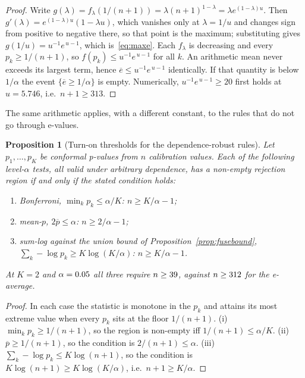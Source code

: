 \documentclass[preprint,12pt,authoryear]{elsarticle}
\newtheorem{proposition}[theorem]{Proposition}
\theoremstyle{definition}
\begin{document}
\begin{proof}
Write $g(\lambda) = f_\lambda(1/(n{+}1)) = \lambda (n{+}1)^{1-\lambda} = \lambda
e^{(1-\lambda)u}$. Then $g'(\lambda) = e^{(1-\lambda)u}(1 - \lambda u)$, which
vanishes only at $\lambda = 1/u$ and changes sign from positive to negative there,
so that point is the maximum; substituting gives $g(1/u) = u^{-1}e^{\,u-1}$, which
is~\eqref{eq:maxe}. Each $f_\lambda$ is decreasing and every $p_k \ge 1/(n{+}1)$,
so $f(p_k) \le u^{-1}e^{\,u-1}$ for all $k$. An arithmetic mean never exceeds its
largest term, hence $\overline{e} \le u^{-1}e^{\,u-1}$ identically. If that
quantity is below $1/\alpha$ the event $\{\overline{e} \ge 1/\alpha\}$ is empty.
Numerically, $u^{-1}e^{\,u-1} \ge 20$ first holds at $u = 5.746$, i.e.\
$n + 1 \ge 313$.
\end{proof}

The same arithmetic applies, with a different constant, to the rules that do not
go through e-values.

\begin{proposition}[Turn-on thresholds for the dependence-robust rules]
\label{prop:turnon}
Let $p_1,\dots,p_K$ be conformal p-values from $n$ calibration values. Each of the
following level-$\alpha$ tests, all valid under arbitrary dependence, has a
non-empty rejection region if and only if the stated condition holds:
\begin{enumerate}[label=(\roman*)]
\item Bonferroni, $\min_k p_k \le \alpha/K$: \quad $n \ge K/\alpha - 1$;
\item mean-$p$, $2\overline{p} \le \alpha$: \quad $n \ge 2/\alpha - 1$;
\item sum-log against the union bound of Proposition~\ref{prop:fusebound},
$\sum_k -\log p_k \ge K\log(K/\alpha)$: \quad $n \ge K/\alpha - 1$.
\end{enumerate}
At $K = 2$ and $\alpha = 0.05$ all three require $n \ge 39$, against
$n \ge 312$ for the e-average.
\end{proposition}

\begin{proof}
In each case the statistic is monotone in the $p_k$ and attains its most extreme
value when every $p_k$ sits at the floor $1/(n{+}1)$. (i) $\min_k p_k \ge
1/(n{+}1)$, so the region is non-empty iff $1/(n{+}1) \le \alpha/K$. (ii)
$\overline{p} \ge 1/(n{+}1)$, so the condition is $2/(n{+}1) \le \alpha$. (iii)
$\sum_k -\log p_k \le K\log(n{+}1)$, so the condition is $K\log(n{+}1) \ge
K\log(K/\alpha)$, i.e.\ $n + 1 \ge K/\alpha$.
\end{proof}
\end{document}
